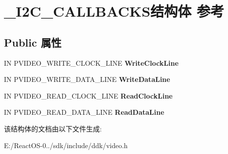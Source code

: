 \hypertarget{struct___i2_c___c_a_l_l_b_a_c_k_s}{}\section{\+\_\+\+I2\+C\+\_\+\+C\+A\+L\+L\+B\+A\+C\+K\+S结构体 参考}
\label{struct___i2_c___c_a_l_l_b_a_c_k_s}
\subsection*{Public 属性}
\begin{DoxyCompactItemize}
\item 
\mbox{\label{struct___i2_c___c_a_l_l_b_a_c_k_s_acab829199786c1df6e5104d078b83d6d}} 
IN P\+V\+I\+D\+E\+O\+\_\+\+W\+R\+I\+T\+E\+\_\+\+C\+L\+O\+C\+K\+\_\+\+L\+I\+NE {\bfseries Write\+Clock\+Line}
\item 
\mbox{\label{struct___i2_c___c_a_l_l_b_a_c_k_s_a3565cc916d9d8e4c37b76c86c8b3b307}} 
IN P\+V\+I\+D\+E\+O\+\_\+\+W\+R\+I\+T\+E\+\_\+\+D\+A\+T\+A\+\_\+\+L\+I\+NE {\bfseries Write\+Data\+Line}
\item 
\mbox{\label{struct___i2_c___c_a_l_l_b_a_c_k_s_a034a73c215c68b524b6fe13729e13bd8}} 
IN P\+V\+I\+D\+E\+O\+\_\+\+R\+E\+A\+D\+\_\+\+C\+L\+O\+C\+K\+\_\+\+L\+I\+NE {\bfseries Read\+Clock\+Line}
\item 
\mbox{\label{struct___i2_c___c_a_l_l_b_a_c_k_s_a889ed40bf566023ba8d5e15bf9e0222e}} 
IN P\+V\+I\+D\+E\+O\+\_\+\+R\+E\+A\+D\+\_\+\+D\+A\+T\+A\+\_\+\+L\+I\+NE {\bfseries Read\+Data\+Line}
\end{DoxyCompactItemize}


该结构体的文档由以下文件生成\+:\begin{DoxyCompactItemize}
\item 
E\+:/\+React\+O\+S-\/0../sdk/include/ddk/video.\+h\end{DoxyCompactItemize}
